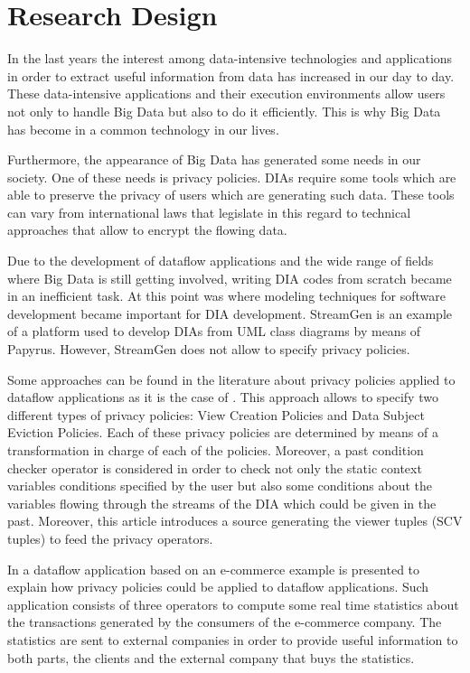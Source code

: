 \chapter[Chapter 3]{Research Design}
\label{sec:chapter3}

In the last years the interest among data-intensive technologies and applications in order to extract useful information from data has increased in our day to day. These data-intensive applications and their execution environments allow users not only to handle Big Data but also to do it efficiently. This is why Big Data has become in a common technology in our lives.

Furthermore, the appearance of Big Data has generated some needs in our society. One of these needs is privacy policies. DIAs require some tools which are able to preserve the privacy of users which are generating such data. These tools can vary from international laws that legislate in this regard to technical approaches that allow to encrypt the flowing data.

Due to the development of dataflow applications and the wide range of fields where Big Data is still getting involved, writing DIA codes from scratch became in an inefficient task. At this point was where modeling techniques for software development became important for DIA development. StreamGen is an example of a platform used to develop DIAs from UML class diagrams by means of Papyrus. However, StreamGen does not allow to specify privacy policies.

Some approaches can be found in the literature about privacy policies applied to dataflow applications as it is the case of \cite{privacypoliciesarticle}. This approach allows to specify two different types of privacy policies: View Creation Policies and Data Subject Eviction Policies. Each of these privacy policies are determined by means of a transformation in charge of each of the policies. Moreover, a past condition checker operator is considered in order to check not only the static context variables conditions specified by the user but also some conditions about the variables flowing through the streams of the DIA which could be given in the past. Moreover, this article introduces a source generating the viewer tuples (SCV tuples) to feed the privacy operators.

In \cite{privacypoliciesarticle} a dataflow application based on an e-commerce example is presented to explain how privacy policies could be applied to dataflow applications. Such application consists of three operators to compute some real time statistics about the transactions generated by the consumers of the e-commerce company. The statistics are sent to external companies in order to provide useful information to both parts, the clients and the external company that buys the statistics.

